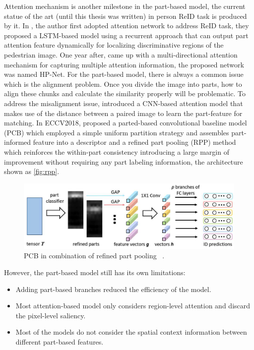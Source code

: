 Attention mechanism is another milestone in the part-based model, the current 
statue of the art (until this thesis was written) in person ReID task is 
produced by it.
In \cite{end-to-end-attention-network-for-reid}, the author first adopted
attention network to address ReID task, they proposed a LSTM-based
model using a recurrent approach that can output part attention feature 
dynamically for localizing discriminative regions of the pedestrian image. One 
year after, \cite{hpnet-attentive-deep-feature-for-reid} came up with a 
multi-directional attention mechanism for capturing multiple attention
information, the proposed network was named HP-Net.
For the part-based model, there is always a common issue which is the alignment 
problem. Once you divide the image into parts, how to align these chunks and 
calculate the similarity properly will be problematic. To address the 
misalignment issue, \cite{part-aligned-for-reid} introduced a CNN-based 
attention model that makes use of the distance between a paired image to
learn the part-feature for matching. In ECCV2018, \cite{pcb-and-rpp-for-reid} 
proposed a parted-based convolutional baseline model (PCB) which employed a 
simple uniform partition strategy and assembles part-informed feature into a 
descriptor and a refined part pooling (RPP) method which reinforces the 
within-part consistency introducing a large margin of improvement without 
requiring any part labeling information, the architecture shown as 
\autoref{fig:rpp}.

\begin{figure}
    \includegraphics[width=\linewidth]{figures/rpp.png}
    \caption{PCB in combination of refined part pooling ~\protect \cite{pcb-and-rpp-for-reid}.}
    \label{fig:rpp}
\end{figure}

However, the part-based model still has its own limitations:

\begin{itemize}
    \item Adding part-based branches reduced the efficiency of the model.
    \item Most attention-based model only considers region-level attention and 
    discard the pixel-level saliency.
    \item Most of the models do not consider the spatial context information 
    between different part-based features.
\end{itemize}

